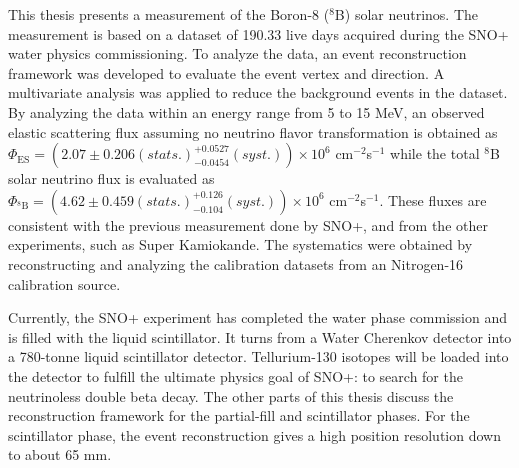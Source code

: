 This thesis presents a measurement of the Boron-8 ($^8$B) solar neutrinos. The measurement is based on a dataset of 190.33 live days acquired during the SNO+ water physics commissioning. To analyze the data, an event reconstruction framework was developed to evaluate the event vertex and direction. A multivariate analysis was applied to reduce the background events in the dataset. By analyzing the data within an energy range from 5 to 15 MeV, an observed elastic scattering flux assuming no neutrino flavor transformation is obtained as $\Phi_{\mathrm{ES}}=(2.07 \pm 0.206 (stats.)^{+0.0527}_{-0.0454}(syst.))\times10^6$ cm$^{-2}$s$^{-1}$ while the total $^8$B solar neutrino flux is evaluated as $\Phi_{\mathrm{^8B}}=(4.62 \pm 0.459 (stats.)^{+0.126}_{-0.104}(syst.))\times10^6$ cm$^{-2}$s$^{-1}$. These fluxes are consistent with the previous measurement done by SNO+\cite{anderson2019measurement}, and from the other experiments, such as Super Kamiokande\cite{abe2016solar}. The systematics were obtained by reconstructing and analyzing the calibration datasets from an Nitrogen-16 calibration source.

Currently, the SNO+ experiment has completed the water phase commission and is filled with the liquid scintillator. It turns from a Water Cherenkov detector into a 780-tonne liquid scintillator detector. Tellurium-130 isotopes will be loaded into the detector to fulfill the ultimate physics goal of SNO+: to search for the neutrinoless double beta decay. The other parts of this thesis discuss the reconstruction framework for the partial-fill and scintillator phases. For the scintillator phase, the event reconstruction gives a high position resolution down to about 65 mm. %